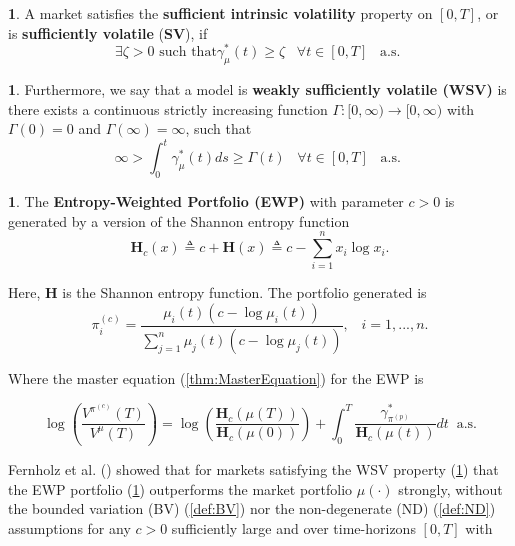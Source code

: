 \documentclass[british]{amsart}
\numberwithin{equation}{section}
\numberwithin{figure}{section}
\theoremstyle{plain}
\theoremstyle{definition}
\newtheorem{defn}[thm]{\protect\definitionname}
\theoremstyle{plain}
\theoremstyle{plain}
\theoremstyle{plain}
\theoremstyle{remark}
\theoremstyle{plain}
\providecommand{\definitionname}{Definition}
\begin{document}
\begin{defn} \label{SV}A market satisfies the \textbf{sufficient intrinsic
volatility} property on $[0,T]$, or is \textbf{sufficiently volatile}
(\textbf{SV}), if \begin{equation} \exists\zeta>0\text{ such that
}\gamma_{\mu}^{*}(t)\ge\zeta\;\;\;\forall t\in[0,T]\;\;\;\text{a.s. }
\end{equation} \end{defn}
%
\begin{defn} \label{WSV}Furthermore, we say that a model is \textbf{weakly
sufficiently volatile (WSV) }is there exists a continuous strictly increasing
function $\Gamma:[0,\infty)\to[0,\infty)$ with $\Gamma(0)=0$ and
$\Gamma(\infty)=\infty$, such that \begin{equation}
\infty>\int_{0}^{t}\gamma_{\mu}^{*}(t)ds\ge\Gamma(t)\;\;\;\forall
t\in[0,T]\;\;\;\text{a.s. } \end{equation} \end{defn}
%
\begin{defn} \label{EWP}The \textbf{Entropy-Weighted Portfolio (EWP) }with
parameter $c>0$ is generated by a version of the Shannon entropy function
\begin{equation} \mathbf{H}_{c}(x)\triangleq c+\mathbf{H}(x)\triangleq
c-\sum_{i=1}^{n}x_{i}\log x_{i}. \end{equation}

Here, $\mathbf{H}$ is the Shannon entropy function. The portfolio generated is
\begin{equation}
\pi_{i}^{(c)}=\frac{\mu_{i}(t)(c-\log\mu_{i}(t))}{\sum_{j=1}^{n}\mu_{j}(t)(c-\log\mu_{j}(t))},\;\;\;i=1,...,n.
\end{equation}

Where the master equation (\ref{thm:MasterEquation}) for the EWP is

\begin{equation}
\log\left(\frac{V^{\pi^{(c)}}(T)}{V^{\mu}(T)}\right)=\log\left(\frac{\mathbf{H}_{c}(\mu(T))}{\mathbf{H}_{c}(\mu(0))}\right)+\int_{0}^{T}\frac{\gamma_{\pi^{(p)}}^{*}}{\mathbf{H}_{c}(\mu(t))}dt\;\;\text{a.s.}
\end{equation} \end{defn} Fernholz et al. (\cite{Fernholz2005a}) showed that for
markets satisfying the WSV property (\ref{WSV}) that the EWP portfolio
(\ref{EWP}) outperforms the market portfolio $\mu(\cdot)$ strongly, without the
bounded variation (BV) (\ref{def:BV}) nor the non-degenerate (ND) (\ref{def:ND})
assumptions for any $c>0$ sufficiently large and over time-horizons $[0,T]$ with
\end{document}
